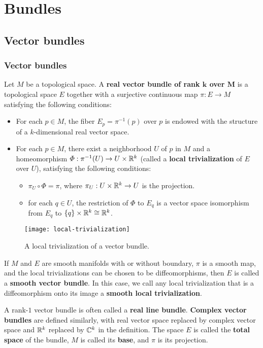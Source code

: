 \chapter{Bundles}
\section{Vector bundles}
\subsection{Vector bundles}
Let $M$ be a topological space. A \textbf{real vector bundle of rank $\bm{k}$ over $\bm{M}$} is a topological space $E$ together with a surjective continuous map $\pi:E\to M$ satisfying the following conditions:
\begin{itemize}
\item For each $p\in M$, the fiber $E_p=\pi^{-1}(p)$ over $p$ is endowed with the structure of a $k$-dimensional real vector space.
\item For each $p\in M$, there exist a neighborhood $U$ of $p$ in $M$ and a homeomorphism $\varPhi:\pi^{-1}(U)\to U\times\mathbb{R}^k$ (called a \textbf{local trivialization} of $E$ over $U$), satisfying the following conditions:
\begin{itemize}
\item $\pi_U\circ\varPhi=\pi$, where $\pi_U:U\times\mathbb{R}^k\to U$ is the projection.
\item for each $q\in U$, the restriction of $\varPhi$ to $E_q$ is a vector space isomorphism from $E_q$ to $\{q\}\times\mathbb{R}^k\cong\mathbb{R}^k$.
\end{itemize}
\end{itemize}
\begin{figure}[htbp]
\centering
\texttt{[image: local-trivialization]}
\caption{A local trivialization of a vector bundle.}
\end{figure}\par
If $M$ and $E$ are smooth manifolds with or without boundary, $\pi$ is a smooth map, and the local trivializations can be chosen to be diffeomorphisms, then $E$ is called a \textbf{smooth vector bundle}. In this case, we call any local trivialization that is a diffeomorphism onto its image a \textbf{smooth local trivialization}.\par
A rank-$1$ vector bundle is often called a \textbf{real line bundle}. \textbf{Complex vector bundles} are defined similarly, with real vector space replaced by complex vector space and $\mathbb{R}^k$ replaced by $\mathbb{C}^k$ in the definition. The space $E$ is called the \textbf{total space} of the bundle, $M$ is called its \textbf{base}, and $\pi$ is its projection.
